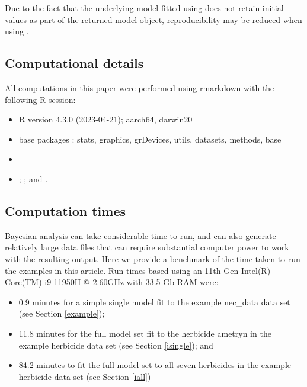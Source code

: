 \documentclass[
  shortnames]{jss}
\begin{document}
Due to the fact that the underlying  model fitted using  does not retain initial values as part of the returned model object, reproducibility may be reduced when using .

\subsection[Computational detail]{Computational details}\label{compdetails}

All computations in this paper were performed using rmarkdown \citep{allaire2023} with the following
R session:

\begin{itemize}
\item
  R version 4.3.0 (2023-04-21); aarch64, darwin20
\item
  base packages \citep{rcore}: stats, graphics, grDevices, utils, datasets, methods, base
\item
   \citep{bayesnec2103}
\item
   \citep{Burkner2017};  \citep{ggplot}; and  \citep{rcpp}.
\end{itemize}

\hypertarget{computation-times}{%
\subsection{Computation times}\label{computation-times}}

Bayesian analysis can take considerable time to run, and can also generate relatively large data files that can require substantial computer power to work with the resulting output. Here we provide a benchmark of the time taken to run the examples in this article. Run times based using an 11th Gen Intel(R) Core(TM) i9-11950H @ 2.60GHz with 33.5 Gb RAM were:

\begin{itemize}
\item
  0.9 minutes for a simple single model fit to the example nec\_data data set (see Section \ref{example});
\item
  11.8 minutes for the full  model set fit to the herbicide ametryn in the example herbicide data set (see Section \ref{isingle}); and
\item
  84.2 minutes to fit the full  model set to all seven herbicides in the example herbicide data set (see Section \ref{iall})
\end{itemize}
\end{document}
